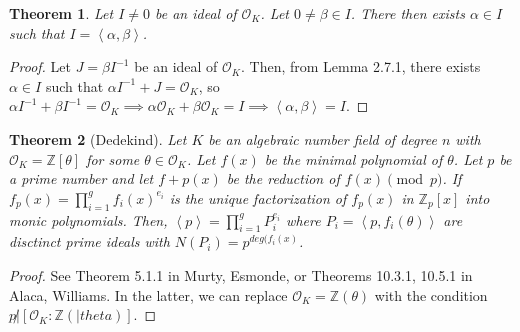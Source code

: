 \documentclass{article}
\newcommand{\la}{\left\langle}
\newcommand{\ra}{\right\rangle}
\newcommand{\air}{\mathcal{O}_K}
\newcommand{\Z}{\mathbb{Z}}
\newtheorem{theorem}{Theorem}[subsection]
\begin{document}
\begin{theorem}
Let $I\neq 0$ be an ideal of $\air$. Let $0\neq \beta\in I$. There then exists $\alpha\in I$ such that $I=\la \alpha,\beta\ra$. 
\end{theorem}
\begin{proof}
Let $J=\beta I^{-1}$ be an ideal of $\air$. Then, from Lemma 2.7.1, there exists $\alpha\in I$ such that $\alpha I^{-1} + J=\air$, so $\alpha I^{-1} + \beta I^{-1} = \air\implies \alpha\air  + \beta\air = I\implies \la \alpha,\beta \ra = I$.
\end{proof}
\begin{theorem}[Dedekind]
Let $K$ be an algebraic number field of degree $n$ with $\air = \Z[\theta]$ for some $\theta\in\air$. Let $f(x)$ be the minimal polynomial of $\theta$. Let $p$ be a prime number and let $f+p(x)$ be the reduction of $f(x)\pmod{p}$. If $f_p(x)=\displaystyle\prod_{i=1}^gf_i(x)^{e_i}$ is the unique factorization of $f_p(x)$ in $\Z_p[x]$ into monic polynomials. Then, $\la p\ra = \prod_{i=1}^g P_i^{e_i}$ where $P_i=\la p, f_i(\theta)\ra$ are disctinct prime ideals with $N(P_i)=p^{deg(f_i(x)}$.
\end{theorem}
\begin{proof}
See Theorem 5.1.1 in Murty, Esmonde, or Theorems 10.3.1, 10.5.1 in Alaca, Williams. In the latter, we can replace $\air = \Z(\theta)$ with the condition $p\not |[\air:\Z(|theta)]$.
\end{proof}
\end{document}
